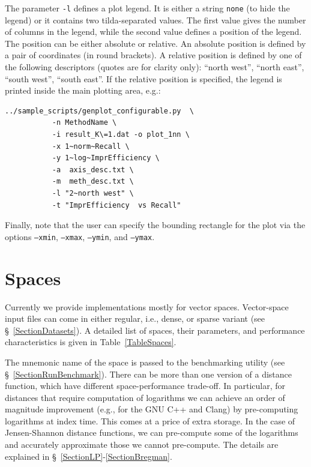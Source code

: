 \documentclass[runningheads,a4paper]{llncs}
\newcommand{\ttt}[1]{\texttt{#1}}
\begin{document}
{The parameter \ttt{-l} defines a plot legend.
It is either a string \ttt{none} (to hide the legend) 
or  it contains two tilda-separated values.
The first value gives the number of columns in the legend, while the second value
defines a position of the legend. The position can be either 
absolute or relative.
An absolute position is defined by a pair of coordinates (in round brackets).
A relative position is defined by one of the following descriptors 
(quotes are for clarity only): ``north west'', ``north east'', ``south west'', ``south east''.
If the relative position is specified, the legend is printed inside the main
plotting area, e.g.:
\begin{verbatim}
../sample_scripts/genplot_configurable.py  \
           -n MethodName \
           -i result_K\=1.dat -o plot_1nn \
           -x 1~norm~Recall \
           -y 1~log~ImprEfficiency \
           -a  axis_desc.txt \
           -m  meth_desc.txt \
           -l "2~north west" \
           -t "ImprEfficiency  vs Recall"
\end{verbatim}

Finally, note that the user can specify the bounding rectangle for the plot
via the options \ttt{--xmin}, \ttt{--xmax}, \ttt{--ymin}, and \ttt{--ymax}.

\section{Spaces}\label{SectionSpaces}
Currently we provide implementations mostly for vector spaces.
Vector-space input files can come in either regular, i.e., dense,
or sparse variant (see \S~\ref{SectionDatasets}). 
A detailed list of spaces, their parameters, 
and performance characteristics is given in Table~\ref{TableSpaces}.

The mnemonic name of the space is passed to the benchmarking utility (see \S~\ref{SectionRunBenchmark}).
There can be more than one version of a distance function,
which have different space-performance trade-off.
In particular, for distances that require computation of logarithms 
we can achieve an order of magnitude improvement (e.g., for the GNU C++
and Clang) by pre-computing
logarithms at index time. This comes at a price of extra storage. 
In the case of Jensen-Shannon distance functions, we can pre-compute some 
of the logarithms and accurately approximate those we cannot pre-compute.
The details are explained in \S~\ref{SectionLP}-\ref{SectionBregman}.

}
\end{document}

